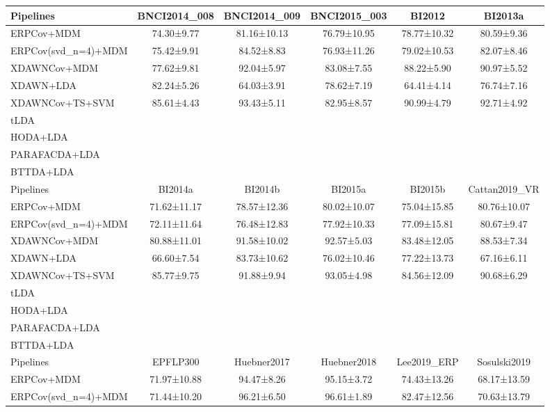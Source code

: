 \begin{tabularx}{\textwidth}{Xccccc}
\toprule
Pipelines            & BNCI2014\_008 & BNCI2014\_009 & BNCI2015\_003 & BI2012 & BI2013a\\
\midrule
ERPCov+MDM            & 74.30±9.77 & 81.16±10.13 & 76.79±10.95 & 78.77±10.32 & 80.59±9.36 \\
ERPCov(svd\_n=4)+MDM  & 75.42±9.91 & 84.52±8.83 & 76.93±11.26 & 79.02±10.53 & 82.07±8.46 \\
XDAWNCov+MDM          & 77.62±9.81 & 92.04±5.97 & 83.08±7.55 & 88.22±5.90 & 90.97±5.52 \\
XDAWN+LDA             & 82.24±5.26 & 64.03±3.91 & 78.62±7.19 & 64.41±4.14 & 76.74±7.16 \\
XDAWNCov+TS+SVM       & 85.61±4.43 & 93.43±5.11 & 82.95±8.57 & 90.99±4.79 & 92.71±4.92\\
tLDA                  & & & & & \\ \midrule
HODA+LDA                  & & & & &  \\
PARAFACDA+LDA             & & & & &  \\
BTTDA+LDA                 & & & & &  \\
\toprule
Pipelines & BI2014a & BI2014b & BI2015a & BI2015b & Cattan2019\_VR\\
\midrule
ERPCov+MDM            & 71.62±11.17 & 78.57±12.36 & 80.02±10.07 & 75.04±15.85 & 80.76±10.07 \\
ERPCov(svd\_n=4)+MDM  & 72.11±11.64 & 76.48±12.83 & 77.92±10.33 & 77.09±15.81 & 80.67±9.47 \\
XDAWNCov+MDM          & 80.88±11.01 & 91.58±10.02 & 92.57±5.03 & 83.48±12.05 & 88.53±7.34 \\
XDAWN+LDA             & 66.60±7.54 & 83.73±10.62 & 76.02±10.46 & 77.22±13.73 & 67.16±6.11 \\
XDAWNCov+TS+SVM       & 85.77±9.75 & 91.88±9.94 & 93.05±4.98 & 84.56±12.09 &90.68±6.29 \\
tLDA                  & & & & & \\ \midrule
HODA+LDA                  & & & & &  \\
PARAFACDA+LDA             & & & & &  \\
BTTDA+LDA                 & & & & &  \\
\toprule
 Pipelines &  EPFLP300 & Huebner2017 & Huebner2018 & Lee2019\_ERP & Sosulski2019 \\
\midrule
ERPCov+MDM            & 71.97±10.88 & 94.47±8.26 & 95.15±3.72 & 74.43±13.26 & 68.17±13.59 \\
ERPCov(svd\_n=4)+MDM  & 71.44±10.20 & 96.21±6.50 & 96.61±1.89 & 82.47±12.56 & 70.63±13.79 \\

\end{tabularx}
